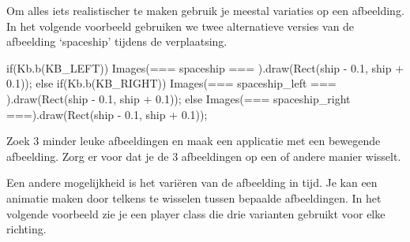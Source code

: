 Om alles iets realistischer te maken gebruik je meestal variaties op een afbeelding. In het volgende voorbeeld gebruiken we twee alternatieve versies van de afbeelding `spaceship' tijdens de verplaatsing.

\begin{code}
if(Kb.b(KB_LEFT))
{
	Images(=== spaceship ===      ).draw(Rect(ship - 0.1,  ship + 0.1));
} else if(Kb.b(KB_RIGHT))
{
	Images(=== spaceship_left === ).draw(Rect(ship - 0.1,  ship + 0.1));
} else
{
	Images(=== spaceship_right ===).draw(Rect(ship - 0.1,  ship + 0.1));
}
\end{code}

\begin{exercise}
Zoek 3 minder leuke afbeeldingen en maak een applicatie met een bewegende afbeelding. Zorg er voor dat je de 3 afbeeldingen op een of andere manier wisselt.
\end{exercise}

Een andere mogelijkheid is het vari\"eren van de afbeelding in tijd. Je kan een animatie maken door telkens te wisselen tussen bepaalde afbeeldingen. In het volgende voorbeeld zie je een player class die drie varianten gebruikt voor elke richting.

